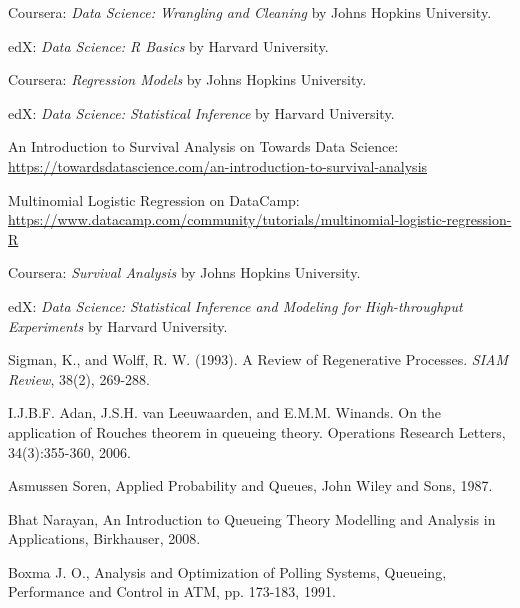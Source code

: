 \begin{thebibliography}{99}
 Coursera: \textit{Data Science: Wrangling and Cleaning} by Johns Hopkins University.

 edX: \textit{Data Science: R Basics} by Harvard University.

 Coursera: \textit{Regression Models} by Johns Hopkins University.

 edX: \textit{Data Science: Statistical Inference} by Harvard University.

 An Introduction to Survival Analysis on Towards Data Science: \url{https://towardsdatascience.com/an-introduction-to-survival-analysis}

 Multinomial Logistic Regression on DataCamp: \url{https://www.datacamp.com/community/tutorials/multinomial-logistic-regression-R}

 Coursera: \textit{Survival Analysis} by Johns Hopkins University.

 edX: \textit{Data Science: Statistical Inference and Modeling for High-throughput Experiments} by Harvard University.

 Sigman, K., and Wolff, R. W. (1993). A Review of Regenerative Processes. \textit{SIAM Review}, 38(2), 269-288.

 I.J.B.F. Adan, J.S.H. van Leeuwaarden, and E.M.M. Winands. On the application of Rouches theorem in queueing theory. Operations Research Letters, 34(3):355-360, 2006.


 Asmussen Soren, Applied Probability and
Queues, John Wiley and Sons, 1987.%

 Bhat Narayan, An Introduction to Queueing Theory
Modelling and Analysis in Applications, Birkhauser, 2008.

 Boxma J. O., Analysis and Optimization of Polling
Systems, Queueing, Performance and Control in ATM, pp. 173-183,
1991.


\end{thebibliography}
